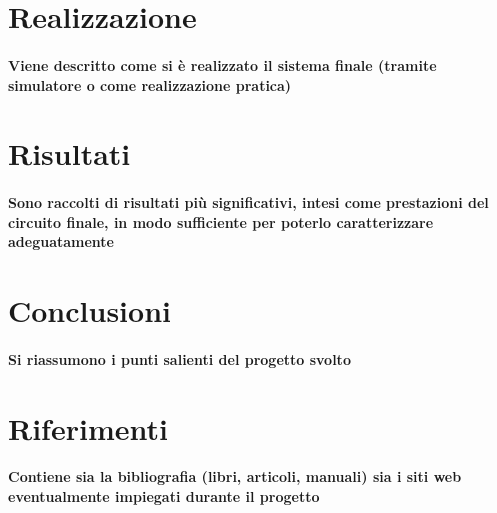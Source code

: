 \documentclass{article}
\begin{document}
\section{Realizzazione}
\paragraph{Viene descritto come si è realizzato il sistema finale (tramite simulatore o come realizzazione pratica)}

\newpage
\section{Risultati}
\paragraph{Sono  raccolti  di  risultati  più  significativi,  intesi  come  prestazioni  del  circuito  finale,  in  modo  sufficiente per poterlo caratterizzare adeguatamente}

\newpage
\section{Conclusioni}
\paragraph{Si riassumono i punti salienti del progetto svolto}

\newpage
\section{Riferimenti}
\paragraph{Contiene  sia  la  bibliografia  (libri,  articoli,  manuali)  sia  i  siti  web  eventualmente  impiegati  durante il progetto}
\end{document}
